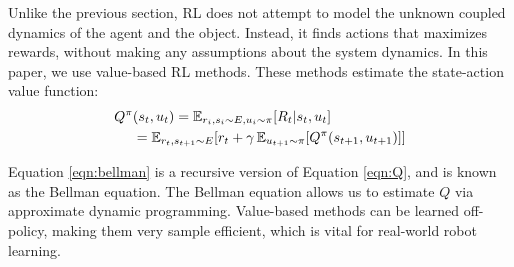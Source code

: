 Unlike the previous section, RL does not attempt to model the unknown coupled dynamics of the agent and the object. Instead, it finds actions that maximizes rewards, without making any assumptions about the system dynamics.
In this paper, we use value-based RL methods. These methods estimate the state-action value function:
\begin{align}
    Q^\pi & (s_t, u_t) = \operatorname{\mathbb{E}}_{r_i, s_i \sim E, u_i \sim \pi}[R_t|s_t, u_t] \label{eqn:Q} \\
                   & = \operatorname{\mathbb{E}}_{r_t, s_{t+1} \sim E}[r_t + \gamma \operatorname{\mathbb{E}}_{u_{t+1} \sim \pi}[Q^\pi(s_{t+1}, u_{t+1})]] \label{eqn:bellman}
\end{align}

\noindent Equation \ref{eqn:bellman} is a recursive version of Equation \ref{eqn:Q}, and is known as the Bellman equation. The Bellman equation allows us to estimate $Q$ via approximate dynamic programming. Value-based methods can be learned off-policy, making them very sample efficient, which is vital for real-world robot learning.
